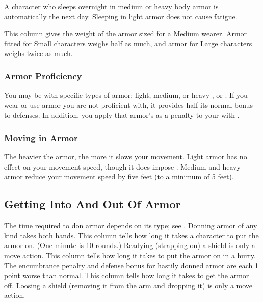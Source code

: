          A character who sleeps overnight in medium or heavy body armor is automatically \fatigued the next day. Sleeping in light armor does not cause fatigue.

         This column gives the weight of the armor sized for a Medium wearer. Armor fitted for Small characters weighs half as much, and armor for Large characters weighs twice as much.

        \subsubsection{Armor Proficiency}\label{Armor Proficiency}
            You may be  with specific types of armor: light, medium, or heavy , or .
            If you wear or use armor you are not proficient with, it provides half its normal bonus to defenses.
            In addition, you apply that armor's  as a penalty to your  with .

        \subsubsection{Moving in Armor}
            The heavier the armor, the more it slows your movement. Light armor has no effect on your movement speed, though it does impose . Medium and heavy armor reduce your movement speed by five feet (to a minimum of 5 feet).

    \subsection{Getting Into And Out Of Armor}
        The time required to don armor depends on its type; see . Donning armor of any kind takes both hands.
         This column tells how long it takes a character to put the armor on. (One minute is 10 rounds.) Readying (strapping on) a shield is only a move action.
         This column tells how long it takes to put the armor on in a hurry. The encumbrance penalty and defense bonus for hastily donned armor are each 1 point worse than normal.
         This column tells how long it takes to get the armor off. Loosing a shield (removing it from the arm and dropping it) is only a move action.

